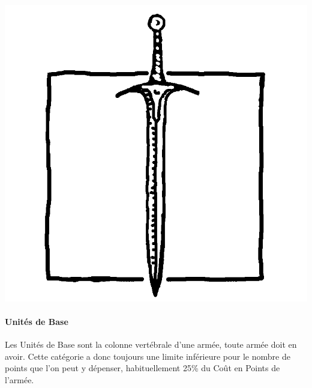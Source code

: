 \begin{minipage}[c]{0.17\textwidth}
\includegraphics[width=\textwidth]{../Layout/pics/logo_core.png}
\end{minipage}\hfill
\begin{minipage}[c]{0.80\textwidth}
\paragraph{Unités de Base}

Les Unités de Base sont la colonne vertébrale d'une armée, toute armée doit en avoir. Cette catégorie a donc toujours une limite inférieure pour le nombre de points que l'on peut y dépenser, habituellement 25\% du Coût en Points de l'armée.
\end{minipage}

